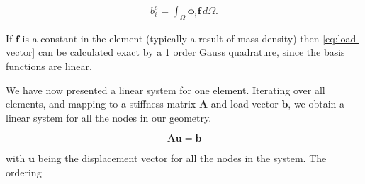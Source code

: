\begin{align}
\label{eq:load-vector}
b^e_i = 
\int_{\Omega} \bm{\phi_i} \bm{f} \, d\Omega.
\end{align}

If $\bm{f}$ is a constant in the element (typically a result of mass density) then \eqref{eq:load-vector} can be calculated exact by a 1 order Gauss quadrature, since the basis functions are linear. 

We have now presented a linear system for one element. Iterating over all elements, and mapping to a stiffness matrix $\bm{A}$ and load vector $\bm{b}$, we obtain a linear system for all the nodes in our geometry. 

\begin{equation}
\bm{A} \bm{u} = \bm{b}
\end{equation}

with $\bm{u}$ being the displacement vector for all the nodes in the system. The ordering